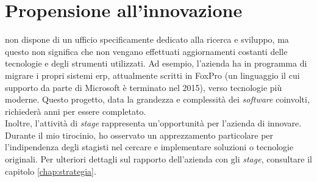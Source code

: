 \section{Propensione all'innovazione}\label{chap:Propensione all'innovazione}
{\company} non dispone di un ufficio specificamente dedicato alla ricerca e sviluppo, ma questo non significa che non 
vengano effettuati aggiornamenti costanti delle tecnologie e degli strumenti utilizzati. Ad esempio, l'azienda ha 
in programma di migrare i propri sistemi \gls{erp}, attualmente scritti in FoxPro (un linguaggio il cui supporto da 
parte di Microsoft è terminato nel 2015), verso tecnologie più moderne. Questo progetto, data la grandezza e 
complessità dei \textit{software} coinvolti, richiederà anni per essere completato.\\
Inoltre, l'attività di \textit{stage} rappresenta un'opportunità per l'azienda di innovare. Durante il mio tirocinio, 
ho osservato un apprezzamento particolare per l'indipendenza degli stagisti nel cercare e implementare 
soluzioni o tecnologie originali. Per ulteriori dettagli sul rapporto dell'azienda con gli \textit{stage}, consultare il 
capitolo \ref{chap:strategia}.
